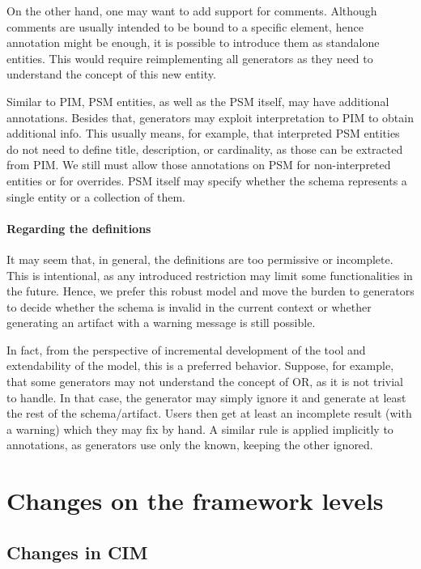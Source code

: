 On the other hand, one may want to add support for comments. Although comments are usually intended to be bound to a specific element, hence annotation might be enough, it is possible to introduce them as standalone entities. This would require reimplementing all generators as they need to understand the concept of this new entity.

\bigskip

Similar to PIM, PSM entities, as well as the PSM itself, may have additional annotations. Besides that, generators may exploit interpretation to PIM to obtain additional info. This usually means, for example, that interpreted PSM entities do not need to define title, description, or cardinality, as those can be extracted from PIM. We still must allow those annotations on PSM for non-interpreted entities or for overrides. PSM itself may specify whether the schema represents a single entity or a collection of them.


\paragraph{Regarding the definitions} It may seem that, in general, the definitions are too permissive or incomplete. This is intentional, as any introduced restriction may limit some functionalities in the future. Hence, we prefer this robust model and move the burden to generators to decide whether the schema is invalid in the current context or whether generating an artifact with a warning message is still possible.

In fact, from the perspective of incremental development of the tool and extendability of the model, this is a preferred behavior. Suppose, for example, that some generators may not understand the concept of OR, as it is not trivial to handle. In that case, the generator may simply ignore it and generate at least the rest of the schema/artifact. Users then get at least an incomplete result (with a warning) which they may fix by hand. A similar rule is applied implicitly to annotations, as generators use only the known, keeping the other ignored.



\section{Changes on the framework levels}

\subsection{Changes in CIM}

